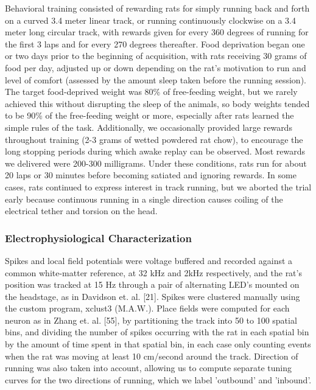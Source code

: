 \documentclass[]{article}
\begin{document}
Behavioral training consisted of rewarding rats for simply running back
and forth on a curved 3.4 meter linear track, or running continuously
clockwise on a 3.4 meter long circular track, with rewards given for
every 360 degrees of running for the first 3 laps and for every 270
degrees thereafter. Food deprivation began one or two days prior to the
beginning of acquisition, with rats receiving 30 grams of food per day,
adjusted up or down depending on the rat's motivation to run and level
of comfort (assessed by the amount sleep taken before the running
session). The target food-deprived weight was 80\% of free-feeding
weight, but we rarely achieved this without disrupting the sleep of the
animals, so body weights tended to be 90\% of the free-feeding weight or
more, especially after rats learned the simple rules of the task.
Additionally, we occasionally provided large rewards throughout training
(2-3 grams of wetted powdered rat chow), to encourage the long stopping
periods during which awake replay can be observed. Most rewards we
delivered were 200-300 milligrams. Under these conditions, rats run for
about 20 laps or 30 minutes before becoming satiated and ignoring
rewards. In some cases, rats continued to express interest in track
running, but we aborted the trial early because continuous running in a
single direction causes coiling of the electrical tether and torsion on
the head.

\subsubsection{Electrophysiological Characterization}

Spikes and local field potentials were voltage buffered and recorded
against a common white-matter reference, at 32 kHz and 2kHz
respectively, and the rat's position was tracked at 15 Hz through a pair
of alternating LED's mounted on the headstage, as in Davidson et. al.
{[}21{]}. Spikes were clustered manually using the custom program,
xclust3 (M.A.W.). Place fields were computed for each neuron as in Zhang
et. al. {[}55{]}, by partitioning the track into 50 to 100 spatial bins,
and dividing the number of spikes occurring with the rat in each spatial
bin by the amount of time spent in that spatial bin, in each case only
counting events when the rat was moving at least 10 cm/second around the
track. Direction of running was also taken into account, allowing us to
compute separate tuning curves for the two directions of running, which
we label 'outbound' and 'inbound'.
\end{document}

